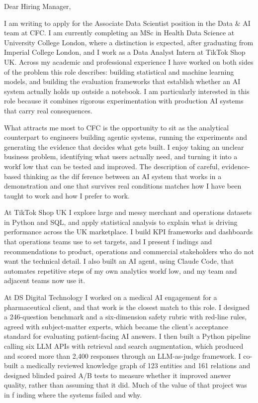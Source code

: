 \documentclass[letterpaper,11pt]{article}
\begin{document}
Dear Hiring Manager,

I am writing to apply for the Associate Data Scientist position in the Data \& AI team at CFC. I am currently completing an MSc in Health Data Science at University College London, where a distinction is expected, after graduating from Imperial College London, and I work as a Data Analyst Intern at TikTok Shop UK. Across my academic and professional experience I have worked on both sides of the problem this role describes: building statistical and machine learning models, and building the evaluation frameworks that establish whether an AI system actually holds up outside a notebook. I am particularly interested in this role because it combines rigorous experimentation with production AI systems that carry real consequences.

What attracts me most to CFC is the opportunity to sit as the analytical counterpart to engineers building agentic systems, running the experiments and generating the evidence that decides what gets built. I enjoy taking an unclear business problem, identifying what users actually need, and turning it into a workf\kern0pt low that can be tested and improved. The description of careful, evidence-based thinking as the dif\kern0pt ference between an AI system that works in a demonstration and one that survives real conditions matches how I have been taught to work and how I prefer to work.

At TikTok Shop UK I explore large and messy merchant and operations datasets in Python and SQL, and apply statistical analysis to explain what is driving performance across the UK marketplace. I build KPI frameworks and dashboards that operations teams use to set targets, and I present f\kern0pt indings and recommendations to product, operations and commercial stakeholders who do not want the technical detail. I also built an AI agent, using Claude Code, that automates repetitive steps of my own analytics workf\kern0pt low, and my team and adjacent teams now use it.

At DS Digital Technology I worked on a medical AI engagement for a pharmaceutical client, and that work is the closest match to this role. I designed a 246-question benchmark and a six-dimension safety rubric with red-line rules, agreed with subject-matter experts, which became the client's acceptance standard for evaluating patient-facing AI answers. I then built a Python pipeline calling six LLM APIs with retrieval and search augmentation, which produced and scored more than 2,400 responses through an LLM-as-judge framework. I co-built a medically reviewed knowledge graph of 123 entities and 161 relations and designed blinded paired A/B tests to measure whether it improved answer quality, rather than assuming that it did. Much of the value of that project was in f\kern0pt inding where the systems failed and why.
\end{document}
